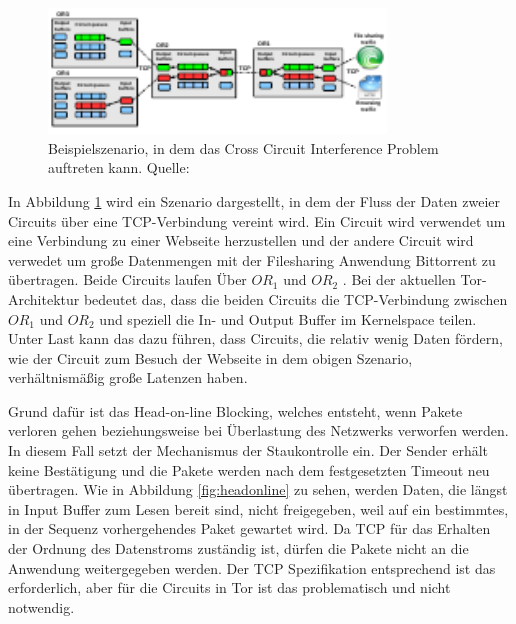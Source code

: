 \documentclass[fleqn,envcountsame,runningheads,10pt,a4paper]{llncs}
\begin{document}
\begin{figure}[ht]
  \begin{center}
    \includegraphics[width=0.8\textwidth]{pics/BufferPic.pdf}
    \caption{Beispielszenario, in dem das Cross Circuit Interference Problem auftreten kann. Quelle: \cite{pctcp} }
    \label{fig:buffer} 
  \end{center} 
\end{figure} 

In Abbildung \ref{fig:buffer} wird ein Szenario dargestellt, in dem der Fluss 
der Daten zweier Circuits über eine TCP-Verbindung vereint wird. Ein Circuit 
wird verwendet um eine Verbindung zu einer Webseite herzustellen und der andere 
Circuit wird verwedet um große Datenmengen mit der Filesharing Anwendung 
Bittorrent zu übertragen. Beide Circuits laufen Über $\textit{OR}_1$ und 
$\textit{OR}_2$ . Bei der aktuellen Tor-Architektur bedeutet das, dass die 
beiden Circuits die TCP-Verbindung zwischen $\textit{OR}_1$ und $\textit{OR}_2$ 
und speziell die In- und Output Buffer im Kernelspace teilen. Unter Last kann das 
dazu führen, dass Circuits, die relativ wenig Daten fördern, wie der Circuit zum 
Besuch der Webseite in dem obigen Szenario, verhältnismäßig große Latenzen 
haben.

Grund dafür ist das Head-on-line Blocking, welches entsteht, wenn Pakete 
verloren gehen beziehungsweise bei Überlastung des Netzwerks verworfen werden. 
In diesem Fall setzt der Mechanismus der Staukontrolle ein. Der Sender erhält 
keine Bestätigung und die Pakete werden nach dem festgesetzten Timeout neu 
übertragen. Wie in Abbildung \ref{fig:headonline} zu sehen, werden Daten, die 
längst in Input Buffer zum Lesen bereit sind, nicht freigegeben, weil auf ein 
bestimmtes, in der Sequenz vorhergehendes Paket gewartet wird. Da TCP für das 
Erhalten der Ordnung des Datenstroms zuständig ist, dürfen die Pakete nicht an 
die Anwendung weitergegeben werden. Der TCP Spezifikation entsprechend ist das 
erforderlich, aber für die Circuits in Tor ist das problematisch und nicht 
notwendig.
\end{document}
